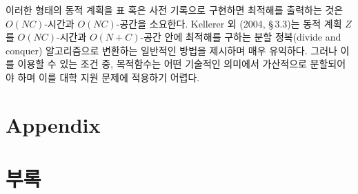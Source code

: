\documentclass[11pt]{article} %
\theoremstyle{definition}
\theoremstyle{definition}
\begin{document}
이러한 형태의 동적 계획을 표 혹은 사전 기록으로 구현하면 최적해를 출력하는 것은 $O(NC)$-시간과 $O(NC)$-공간을 소요한다. Kellerer 외 (2004, \S\,3.3)는 동적 계획 $Z$를 $O(N C)$-시간과 $O(N + C)$-공간 안에 최적해를 구하는 분할 정복(divide and conquer) 알고리즘으로 변환하는 일반적인 방법을 제시하며 매우 유익하다. 그러나 이를 이용할 수 있는 조건 중, 목적함수는 어떤 기술적인 의미에서 가산적으로 분할되어야 하며 이를 대학 지원 문제에 적용하기 어렵다.
\fi

\appendix
\ifen \section{Appendix} \else \section{부록} \fi
\end{document}
